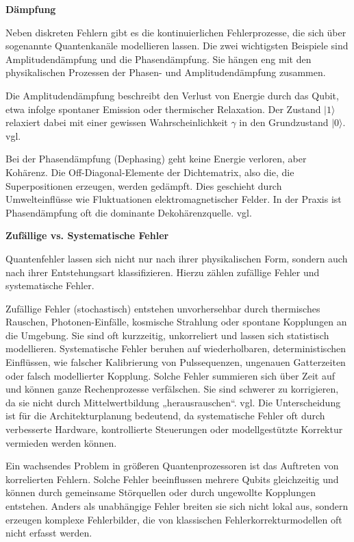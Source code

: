 \textbf{Dämpfung}

Neben diskreten Fehlern gibt es die kontinuierlichen Fehlerprozesse, die sich über sogenannte Quantenkanäle modellieren lassen. Die zwei wichtigsten Beispiele sind Amplitudendämpfung und die Phasendämpfung. Sie hängen eng mit den physikalischen Prozessen der Phasen- und Amplitudendämpfung zusammen.

Die Amplitudendämpfung beschreibt den Verlust von Energie durch das Qubit, etwa infolge spontaner Emission oder thermischer Relaxation. Der Zustand $|1\rangle$ relaxiert dabei mit einer gewissen Wahrscheinlichkeit $\gamma$ in den Grundzustand $|0\rangle$. vgl. \cite[Seite 380-383]{nielsen_quantum_2010}

Bei der Phasendämpfung (Dephasing) geht keine Energie verloren, aber Kohärenz. Die Off-Diagonal-Elemente der Dichtematrix, also die, die Superpositionen erzeugen, werden gedämpft. Dies geschieht durch Umwelteinflüsse wie Fluktuationen elektromagnetischer Felder. In der Praxis ist Phasendämpfung oft die dominante Dekohärenzquelle. vgl. \cite[Seite 383-386]{nielsen_quantum_2010}\medskip



\textbf{Zufällige vs. Systematische Fehler}

Quantenfehler lassen sich nicht nur nach ihrer physikalischen Form, sondern auch nach ihrer Entstehungsart klassifizieren. Hierzu zählen zufällige Fehler und systematische Fehler.

Zufällige Fehler (stochastisch) entstehen unvorhersehbar durch thermisches Rauschen, Photonen-Einfälle, kosmische Strahlung oder spontane Kopplungen an die Umgebung. Sie sind oft kurzzeitig, unkorreliert und lassen sich statistisch modellieren.
Systematische Fehler beruhen auf wiederholbaren, deterministischen Einflüssen, wie falscher Kalibrierung von Pulssequenzen, ungenauen Gatterzeiten oder falsch modellierter Kopplung. Solche Fehler summieren sich über Zeit auf und können ganze Rechenprozesse verfälschen. Sie sind schwerer zu korrigieren, da sie nicht durch Mittelwertbildung „herausrauschen“. vgl. \cite[Seite 3-5]{acharyaQuantumErrorCorrection2025a}
Die Unterscheidung ist für die Architekturplanung bedeutend, da systematische Fehler oft durch verbesserte Hardware, kontrollierte Steuerungen oder modellgestützte Korrektur vermieden werden können.

Ein wachsendes Problem in größeren Quantenprozessoren ist das Auftreten von korrelierten Fehlern. Solche Fehler beeinflussen mehrere Qubits gleichzeitig und können durch gemeinsame Störquellen oder durch ungewollte Kopplungen entstehen. Anders als unabhängige Fehler breiten sie sich nicht lokal aus, sondern erzeugen komplexe Fehlerbilder, die von klassischen Fehlerkorrekturmodellen oft nicht erfasst werden.


